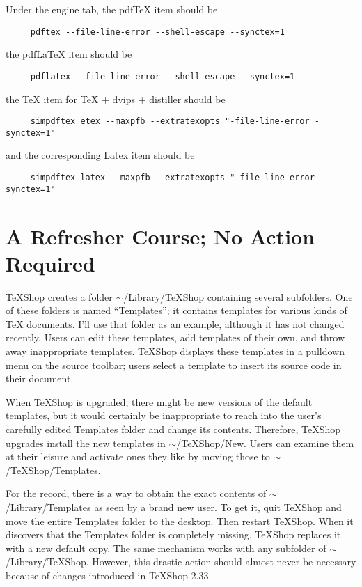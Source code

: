 \documentclass[11pt, oneside]{amsart}
\begin{document}
Under the engine tab, the pdfTeX item should be
\begin{verbatim}
     pdftex --file-line-error --shell-escape --synctex=1
\end{verbatim}
the pdfLaTeX item should be
\begin{verbatim}
     pdflatex --file-line-error --shell-escape --synctex=1 
\end{verbatim}
the TeX item for TeX + dvips + distiller should be
\begin{verbatim}
     simpdftex etex --maxpfb --extratexopts "-file-line-error -synctex=1"
\end{verbatim}
and the corresponding Latex item should be
\begin{verbatim}
     simpdftex latex --maxpfb --extratexopts "-file-line-error -synctex=1"
\end{verbatim}

\section{A Refresher Course; No Action Required}

TeXShop creates a folder $\sim$/Library/TeXShop containing several subfolders. One of these folders is named ``Templates''; it  contains templates for various kinds of TeX documents. I'll use that folder as an example, although it has not changed recently. Users can edit these templates, add templates of their own, and throw away inappropriate templates. TeXShop displays these templates in a pulldown menu on the source toolbar; users select a template to insert its source code in their document.

When TeXShop is upgraded, there might be new versions of the default templates, but it would certainly be inappropriate to reach into the user's carefully edited Templates folder and change its contents. Therefore, TeXShop upgrades install the new templates in $\sim$/TeXShop/New.  Users can examine them at their leisure and activate ones they like by moving those to $\sim$/TeXShop/Templates.

For the record, there is a way to obtain the exact contents of $\sim$/Library/Templates as seen by a brand new user.  To get it, quit TeXShop and move the entire Templates folder to the desktop. Then restart TeXShop. When it discovers that the Templates folder is completely missing, TeXShop replaces it with a new default copy. The same mechanism works with any subfolder of $\sim$/Library/TeXShop. However, this drastic action should almost never be necessary because of changes introduced in TeXShop 2.33.
\end{document}
